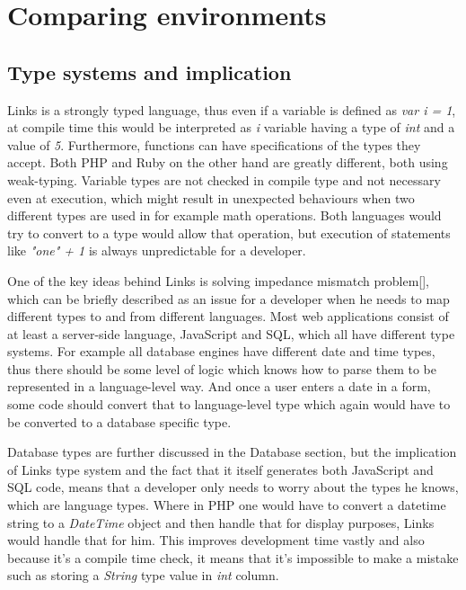 
\chapter{Comparing environments}

\section{Type systems and implication}

Links is a strongly typed language, thus even if a variable is defined as \textit{var i = 1}, at compile time this would be interpreted as \textit{i} variable having a type of \textit{int} and a value of \textit{5}. Furthermore, functions can have specifications of the types they accept. Both PHP and Ruby on the other hand are greatly different, both using weak-typing. Variable types are not checked in compile type and not necessary even at execution, which might result in unexpected behaviours when two different types are used in for example math operations. Both languages would try to convert to a type would allow that operation, but execution of statements like \textit{"one" + 1} is always unpredictable for a developer.

One of the key ideas behind Links is solving impedance mismatch problem[], which can be briefly described as an issue for a developer when he needs to map different types to and from different languages. Most web applications consist of at least a server-side language, JavaScript and SQL, which all have different type systems. For example all database engines have different date and time types, thus there should be some level of logic which knows how to parse them to be represented in a language-level way. And once a user enters a date in a form, some code should convert that to language-level type which again would have to be converted to a database specific type.

Database types are further discussed in the Database section, but the implication of Links type system and the fact that it itself generates both JavaScript and SQL code, means that a developer only needs to worry about the types he knows, which are language types. Where in PHP one would have to convert a datetime string to a \textit{DateTime} object and then handle that for display purposes, Links would handle that for him. This improves development time vastly and also because it's a compile time check, it means that it's impossible to make a mistake such as storing a \textit{String} type value in \textit{int} column.

